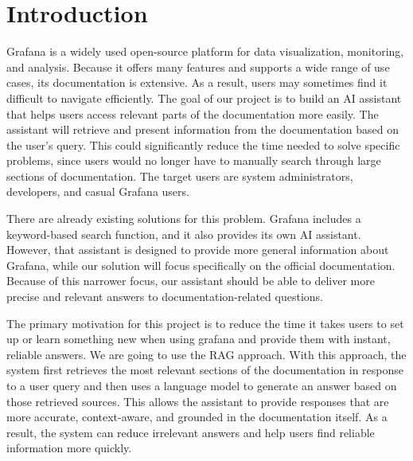 \documentclass[fleqn,moreauthors,10pt]{ds_report}
\affiliation{\textit{Advisors: Slavko Žitnik}}
\begin{document}
\flushbottom 

\maketitle 
\thispagestyle{empty} 


\section*{Introduction}
    Grafana is a widely used open-source platform for data visualization, monitoring, and analysis. Because it offers many features and supports a wide range of use cases, its documentation is extensive. As a result, users may sometimes find it difficult to navigate efficiently. The goal of our project is to build an AI assistant that helps users access relevant parts of the documentation more easily. The assistant will retrieve and present information from the documentation based on the user’s query. This could significantly reduce the time needed to solve specific problems, since users would no longer have to manually search through large sections of documentation. The target users are system administrators, developers, and casual Grafana users.

    There are already existing solutions for this problem. Grafana includes a keyword-based search function, and it also provides its own AI assistant. However, that assistant is designed to provide more general information about Grafana, while our solution will focus specifically on the official documentation. Because of this narrower focus, our assistant should be able to deliver more precise and relevant answers to documentation-related questions.

    The primary motivation for this project is to reduce the time it takes users to set up or learn something new when using grafana and provide them with instant, reliable answers. We are going to use the RAG approach. With this approach, the system first retrieves the most relevant sections of the documentation in response to a user query and then uses a language model to generate an answer based on those retrieved sources. This allows the assistant to provide responses that are more accurate, context-aware, and grounded in the documentation itself. As a result, the system can reduce irrelevant answers and help users find reliable information more quickly.
\end{document}
